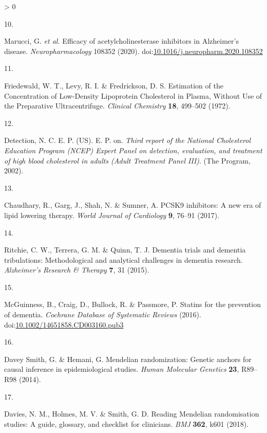 \documentclass[a4paper, twoside]{templates/ociamthesis}
\newlength{\cslhangindent}
\newlength{\csllabelwidth}
\newenvironment{CSLReferences}[3] %
 {%
  \setlength{\parindent}{0pt}
  \ifodd #1 \everypar{\setlength{\hangindent}{\cslhangindent}}\ignorespaces\fi
  \ifnum #2 > 0
  \setlength{\parskip}{#2\baselineskip}
  \fi
 }%
 {}
\newcommand{\CSLLeftMargin}[1]{\parbox[t]{\maxof{\widthof{#1}}{\csllabelwidth}}{#1}}
\newcommand{\CSLRightInline}[1]{\parbox[t]{\linewidth - \csllabelwidth}{#1}}
\begin{document}
\begin{CSLReferences}{0}{0}
\leavevmode\hypertarget{ref-marucci2020}{}%
\CSLLeftMargin{10. }
\CSLRightInline{Marucci, G. \emph{et al.} Efficacy of acetylcholinesterase inhibitors in {Alzheimer}'s disease. \emph{Neuropharmacology} 108352 (2020). doi:\href{https://doi.org/10.1016/j.neuropharm.2020.108352}{10.1016/j.neuropharm.2020.108352}}

\leavevmode\hypertarget{ref-friedewald1972}{}%
\CSLLeftMargin{11. }
\CSLRightInline{Friedewald, W. T., Levy, R. I. \& Fredrickson, D. S. Estimation of the {Concentration} of {Low}-{Density Lipoprotein Cholesterol} in {Plasma}, {Without Use} of the {Preparative Ultracentrifuge}. \emph{Clinical Chemistry} \textbf{18}, 499--502 (1972).}

\leavevmode\hypertarget{ref-national2002third}{}%
\CSLLeftMargin{12. }
\CSLRightInline{Detection, N. C. E. P. (US). E. P. on. \emph{Third report of the {National Cholesterol Education Program} ({NCEP}) {Expert Panel} on detection, evaluation, and treatment of high blood cholesterol in adults ({Adult Treatment Panel III})}. ({The Program}, 2002).}

\leavevmode\hypertarget{ref-chaudhary2017}{}%
\CSLLeftMargin{13. }
\CSLRightInline{Chaudhary, R., Garg, J., Shah, N. \& Sumner, A. {PCSK9} inhibitors: {A} new era of lipid lowering therapy. \emph{World Journal of Cardiology} \textbf{9}, 76--91 (2017).}

\leavevmode\hypertarget{ref-ritchie2015}{}%
\CSLLeftMargin{14. }
\CSLRightInline{Ritchie, C. W., Terrera, G. M. \& Quinn, T. J. Dementia trials and dementia tribulations: Methodological and analytical challenges in dementia research. \emph{Alzheimer's Research \& Therapy} \textbf{7}, 31 (2015).}

\leavevmode\hypertarget{ref-mcguinness2016a}{}%
\CSLLeftMargin{15. }
\CSLRightInline{McGuinness, B., Craig, D., Bullock, R. \& Passmore, P. Statins for the prevention of dementia. \emph{Cochrane Database of Systematic Reviews} (2016). doi:\href{https://doi.org/10.1002/14651858.CD003160.pub3}{10.1002/14651858.CD003160.pub3}}

\leavevmode\hypertarget{ref-daveysmith2014}{}%
\CSLLeftMargin{16. }
\CSLRightInline{Davey Smith, G. \& Hemani, G. Mendelian randomization: Genetic anchors for causal inference in epidemiological studies. \emph{Human Molecular Genetics} \textbf{23}, R89--R98 (2014).}

\leavevmode\hypertarget{ref-davies2018}{}%
\CSLLeftMargin{17. }
\CSLRightInline{Davies, N. M., Holmes, M. V. \& Smith, G. D. Reading {Mendelian} randomisation studies: A guide, glossary, and checklist for clinicians. \emph{BMJ} \textbf{362}, k601 (2018).}


\end{CSLReferences}
\end{document}
